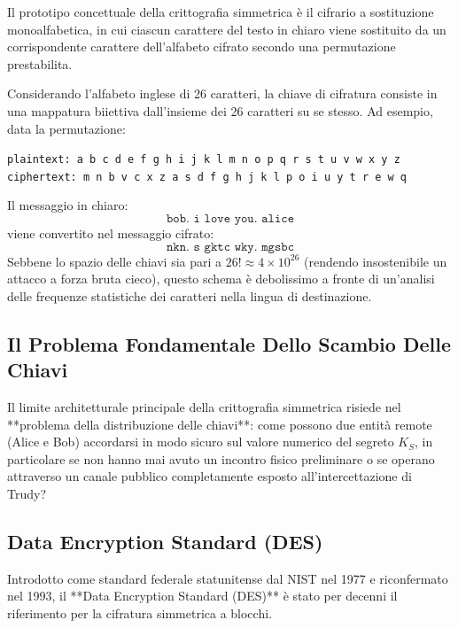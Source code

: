 \documentclass[11pt, a4paper]{article}
\begin{document}
Il prototipo concettuale della crittografia simmetrica è il cifrario a sostituzione monoalfabetica, in cui ciascun carattere del testo in chiaro viene sostituito da un corrispondente carattere dell'alfabeto cifrato secondo una permutazione prestabilita.


Considerando l'alfabeto inglese di 26 caratteri, la chiave di cifratura consiste in una mappatura biiettiva dall'insieme dei 26 caratteri su se stesso. Ad esempio, data la permutazione:
\begin{center}
\small
\texttt{plaintext:  a b c d e f g h i j k l m n o p q r s t u v w x y z}\\
\texttt{ciphertext: m n b v c x z a s d f g h j k l p o i u y t r e w q}
\end{center}
Il messaggio in chiaro:
\[
\texttt{bob. i love you. alice}
\]
viene convertito nel messaggio cifrato:
\[
\texttt{nkn. s gktc wky. mgsbc}
\]
Sebbene lo spazio delle chiavi sia pari a $26! \approx 4 \times 10^{26}$ (rendendo insostenibile un attacco a forza bruta cieco), questo schema è debolissimo a fronte di un'analisi delle frequenze statistiche dei caratteri nella lingua di destinazione.

\subsection{Il Problema Fondamentale Dello Scambio Delle Chiavi}

Il limite architetturale principale della crittografia simmetrica risiede nel **problema della distribuzione delle chiavi**: come possono due entità remote (Alice e Bob) accordarsi in modo sicuro sul valore numerico del segreto $K_S$, in particolare se non hanno mai avuto un incontro fisico preliminare o se operano attraverso un canale pubblico completamente esposto all'intercettazione di Trudy?

\subsection{Data Encryption Standard (DES)}

Introdotto come standard federale statunitense dal NIST nel 1977 e riconfermato nel 1993, il **Data Encryption Standard (DES)** è stato per decenni il riferimento per la cifratura simmetrica a blocchi.
\end{document}
